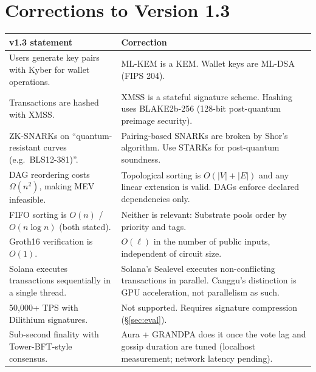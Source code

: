 \documentclass[11pt]{article}
\theoremstyle{definition}
\theoremstyle{remark}
\begin{document}



\appendix
\section{Corrections to Version 1.3}

\begin{table}[ht]
\centering\small
\begin{tabularx}{\textwidth}{@{}XX@{}}
\toprule
\textbf{v1.3 statement} & \textbf{Correction} \\
\midrule
Users generate key pairs with Kyber for wallet operations. & ML-KEM is a KEM. Wallet keys are ML-DSA (FIPS 204). \\
Transactions are hashed with XMSS. & XMSS is a stateful signature scheme. Hashing uses BLAKE2b-256 (128-bit post-quantum preimage security). \\
ZK-SNARKs on ``quantum-resistant curves (e.g.\ BLS12-381)''. & Pairing-based SNARKs are broken by Shor's algorithm. Use STARKs for post-quantum soundness. \\
DAG reordering costs $\Omega(n^2)$, making MEV infeasible. & Topological sorting is $O(|V|+|E|)$ and any linear extension is valid. DAGs enforce declared dependencies only. \\
FIFO sorting is $O(n)$ / $O(n \log n)$ (both stated). & Neither is relevant: Substrate pools order by priority and tags. \\
Groth16 verification is $O(1)$. & $O(\ell)$ in the number of public inputs, independent of circuit size. \\
Solana executes transactions sequentially in a single thread. & Solana's Sealevel executes non-conflicting transactions in parallel. Canggu's distinction is GPU acceleration, not parallelism as such. \\
50{,}000+ TPS with Dilithium signatures. & Not supported. Requires signature compression (\S\ref{sec:eval}). \\
Sub-second finality with Tower-BFT-style consensus. & Aura + GRANDPA does it once the vote lag and gossip duration are tuned (localhost measurement; network latency pending). \\
\bottomrule
\end{tabularx}
\end{table}
\end{document}
